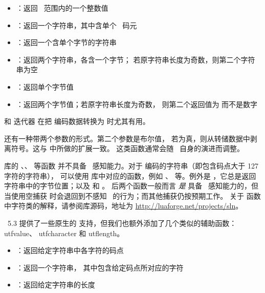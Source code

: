 \begin{itemize}\item {}：返回 \UNICODE\ 范围内的一个整数值

\item {}：返回一个字符串，其中含单个 \ 码元

\item {}：返回一个含单个字节的字符串

\item {}：返回两个字符串，各含一个字节；
    若原字符串长度为奇数，则第二个字符串为空

\item {}：返回单个字节值

\item {}：返回两个字节值；若原字符串长度为奇数，
    则第二个返回值为  而不是数字

\end{itemize}

 和  迭代器
在把  编码数据转换为  时尤其有用。

 还有一种带两个参数的形式。第二个参数是布尔值，
若为真，则从转储数据中剥离符号。这与  中所做的扩展一致。
这类函数通常会随 \LUA\ 自身的演进而调整。

 库的 、、 等函数
并不具备 \UNICODE\ 感知能力。对于  编码的字符串（即包含码点大于 127 字符的字符串），
可以使用  库中对应的函数，例如 、
 等。例外是 ，它总是返回
字符串中的字节位置；以及  和 。
后两个函数一般而言 {\it 是} 具备 \UNICODE\ 感知能力的，但当使用空捕获
\type {()} 时会退回到不感知 \UNICODE\ 的行为；而其他捕获仍按预期工作。
关于  函数中字符类的解释，请参阅库源码，地址为
\url{http://luaforge.net/projects/sln}。

\LUA\ 5.3 提供了一些原生的  支持，但我们也额外添加了几个类似的辅助函数：
 {utfvalue}、 {utfcharacter}
和  {utflength}。

\begin{itemize}\item {}：返回给定字符串中各字符的码点

\item {}：返回一个字符串，
    其中包含给定码点所对应的字符

\item {}：返回给定字符串的长度

\end{itemize}

